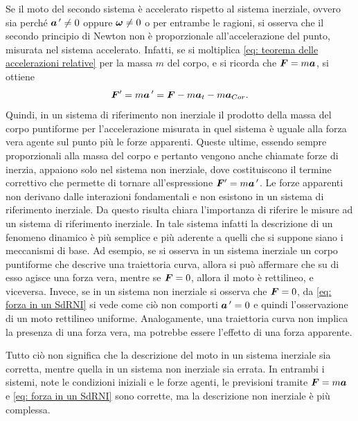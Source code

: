 Se il moto del secondo sistema è accelerato rispetto al sistema inerziale, ovvero sia perché $\bm{a}\,'\neq0$ oppure $\bm{\omega}\ne0$ o per entrambe le ragioni, si osserva che il secondo principio di Newton non è proporzionale all'accelerazione del punto, misurata nel sistema accelerato. Infatti, se si moltiplica \eqref{eq: teorema delle accelerazioni relative} per la massa $m$ del corpo, e si ricorda che $\bm{F}=m\bm{a}$, si ottiene 
\begin{equation}
\label{eq: forza in un SdRNI}
    \bm{F}'=m\bm{a}\,'=\bm{F}-m\bm{a}_t-m\bm{a}_{Cor}.
\end{equation}
Quindi, in un sistema di riferimento non inerziale il prodotto della massa del corpo puntiforme per l'accelerazione misurata in quel sistema è uguale alla forza vera agente sul punto più le forze apparenti. Queste ultime, essendo sempre proporzionali alla massa del corpo e pertanto vengono anche chiamate forze di inerzia, appaiono solo nel sistema non inerziale, dove costituiscono il termine correttivo che permette di tornare all'espressione $\bm{F}'=m\bm{a}\,'$. Le forze apparenti non derivano dalle interazioni fondamentali e non esistono in un sistema di riferimento inerziale. Da questo risulta chiara l'importanza di riferire le misure ad un sistema di riferimento inerziale. In tale sistema infatti la descrizione di un fenomeno dinamico è più semplice e più aderente a quelli che si suppone siano i meccanismi di base. Ad esempio, se si osserva in un sistema inerziale un corpo puntiforme che descrive una traiettoria curva, allora si può affermare che su di esso agisce una forza vera, mentre se $\bm{F}=0$, allora il moto è rettilineo, e viceversa. Invece, se in un sistema non inerziale si osserva che $\bm{F}=0$, da \eqref{eq: forza in un SdRNI} si vede come ciò non comporti $\bm{a}\,'=0$ e quindi l'osservazione di un moto rettilineo uniforme. Analogamente, una traiettoria curva non implica la presenza di una forza vera, ma potrebbe essere l'effetto di una forza apparente. 

Tutto ciò non significa che la descrizione del moto in un sistema inerziale sia corretta, mentre quella in un sistema non inerziale sia errata. In entrambi i sistemi, note le condizioni iniziali e le forze agenti, le previsioni tramite $\bm{F}=m\bm{a}$ e \eqref{eq: forza in un SdRNI} sono corrette, ma la descrizione non inerziale è più complessa. 

